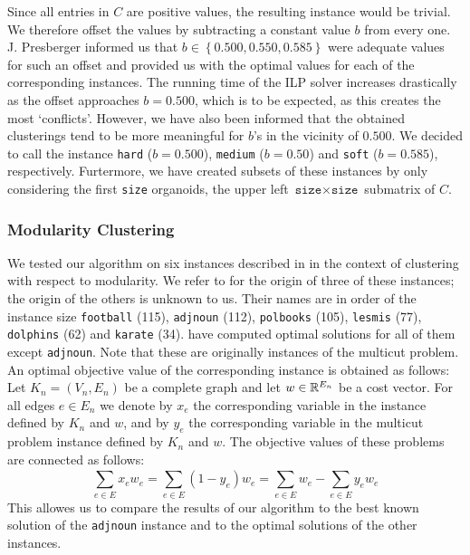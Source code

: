 Since all entries in $C$ are positive values, the resulting \CP instance would be trivial.
We therefore offset the values by subtracting a constant value $b$ from every one.
J. Presberger informed us that $b \in \left\{ 0.500, 0.550, 0.585 \right\}$ were adequate values for such an offset and provided us with the optimal values for each of the corresponding instances.
The running time of the ILP solver increases drastically as the offset approaches $b = 0.500$, which is to be expected, as this creates the most ‘conflicts’.
However, we have also been informed that the obtained clusterings tend to be more meaningful for $b$’s in the vicinity of $0.500$.
We decided to call the instance \texttt{hard} ($b= 0.500$), \texttt{medium} ($b = 0.50$) and \texttt{soft} ($b = 0.585$), respectively.
Furtermore, we have created subsets of these instances by only considering the first \texttt{size} organoids, \ie the upper left $\texttt{size} \times \texttt{size}$ submatrix of $C$.

\subsubsection{Modularity Clustering}
We tested our algorithm on six instances described in \cite{kappesComparativeStudyModern2015} in the context of clustering with respect to modularity.
We refer to \cite{brandesModularityClustering2008} for the origin of three of these instances; the origin of the others is unknown to us.
Their names are in order of the instance size \texttt{football} (115), \texttt{adjnoun} (112), \texttt{polbooks} (105), \texttt{lesmis} (77), \texttt{dolphins} (62) and \texttt{karate} (34).
\cite{kappesComparativeStudyModern2015} have computed optimal solutions for all of them except \texttt{adjnoun}.
Note that these are originally instances of the multicut problem.
An optimal objective value of the corresponding \CP instance is obtained as follows:
Let $K_{n} = (V_{n}, E_{n})$ be a complete graph and let $w \in \mathbb{R}^{E_{n}}$ be a cost vector.
For all edges $e \in E_{n}$ we denote by $x_{e}$ the corresponding variable in the \CP instance defined by $K_{n}$ and $w$, and by $y_{e}$ the corresponding variable in the multicut problem instance defined by $K_{n}$ and $w$.
The objective values of these problems are connected as follows:
\[
	\sum_{e \in E} x_{e} w_{e} = \sum_{e \in E}^{} (1-y_{e}) w_{e} = \sum_{e \in E}^{} w_{e} - \sum_{e \in E}^{} y_{e} w_{e}
\]
This allowes us to compare the results of our algorithm to the best known solution of the \texttt{adjnoun} instance and to the optimal solutions of the other instances. 

